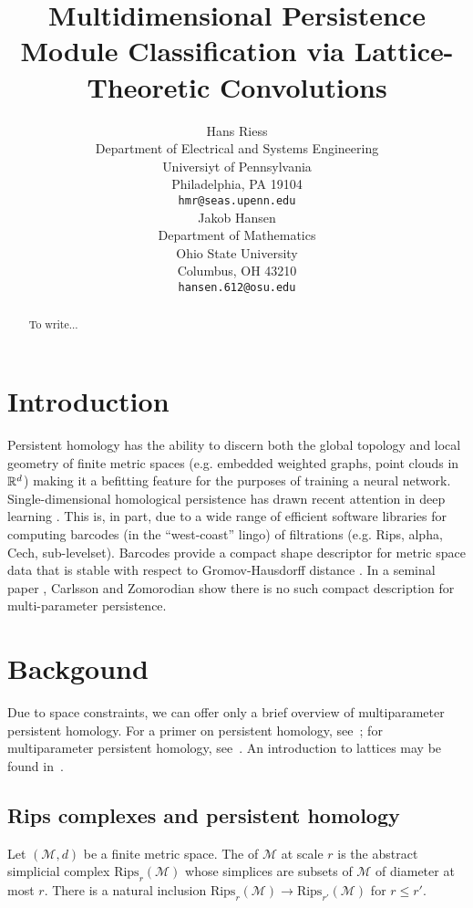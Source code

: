 \documentclass{article}
\title{Multidimensional Persistence Module Classification via Lattice-Theoretic Convolutions}
\author{%
  Hans Riess  \\
  Department of Electrical and Systems Engineering \\
  Universiyt of Pennsylvania\\
  Philadelphia, PA 19104 \\
  \texttt{hmr@seas.upenn.edu} \\
  \And
  Jakob Hansen \\
  Department of Mathematics \\
  Ohio State University \\
  Columbus, OH 43210 \\
  \texttt{hansen.612@osu.edu}
}
\begin{document}
\maketitle

\begin{abstract}
 To write...
\end{abstract}

\section{Introduction}

Persistent homology has the ability to discern both the global topology \cite{}
and local geometry \cite{} of finite metric spaces (e.g. embedded weighted
graphs, point clouds in $\mathbb{R}^d$) making it a befitting feature for the purposes of
training a neural network. Single-dimensional homological persistence has drawn
recent attention in deep learning \cite{hofer_deep_2017,pun_persistent-homology-based_2018,bruel-gabrielsson_topology_2020}. This is, in part, due to a wide range
of efficient software libraries \cite{otter_roadmap_2017,henselman_matroid_2017,bauer_ripser:_2019} for computing barcodes (in the
``west-coast'' lingo) of filtrations (e.g. Rips, alpha, {C}ech, sub-levelset).
Barcodes provide a compact shape descriptor for metric space data that
is stable with respect to Gromov-Hausdorff distance \cite{}. In a seminal paper
\cite{carlsson_theory_2009}, Carlsson and Zomorodian show there is no such compact description for
multi-parameter persistence.

\section{Backgound}
Due to space constraints, we can offer only a brief overview of multiparameter
persistent homology. For a primer on persistent homology,
see~\cite{ghrist_barcodes:_2008,carlsson_topology_2009}; for multiparameter
persistent homology, see~\cite{}. An introduction to lattices may be found in~\cite{}. 

\subsection{Rips complexes and persistent homology}
Let $(\mathcal M,d)$ be a finite metric space. The  of $\mathcal M$ at scale $r$ is the abstract simplicial complex
$\text{Rips}_r(\mathcal M)$ whose simplices are subsets of $\mathcal M$ of
diameter at most $r$. There is a natural inclusion $\text{Rips}_r(\mathcal M)
\to \text{Rips}_{r'}(\mathcal M)$ for $r \leq r'$.
\end{document}

